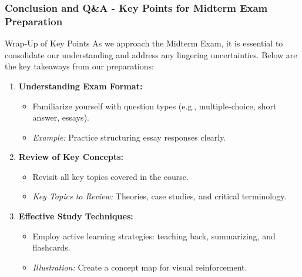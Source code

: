 \documentclass{beamer}
\begin{document}
\begin{frame}[fragile]
    \frametitle{Conclusion and Q\&A - Key Points for Midterm Exam Preparation}
    \begin{block}{Wrap-Up of Key Points}
        As we approach the Midterm Exam, it is essential to consolidate our understanding and address any lingering uncertainties. Below are the key takeaways from our preparations:
    \end{block}
    \begin{enumerate}
        \item \textbf{Understanding Exam Format:}
        \begin{itemize}
            \item Familiarize yourself with question types (e.g., multiple-choice, short answer, essays).
            \item \textit{Example:} Practice structuring essay responses clearly.
        \end{itemize}

        \item \textbf{Review of Key Concepts:}
        \begin{itemize}
            \item Revisit all key topics covered in the course.
            \item \textit{Key Topics to Review:} Theories, case studies, and critical terminology.
        \end{itemize}

        \item \textbf{Effective Study Techniques:}
        \begin{itemize}
            \item Employ active learning strategies: teaching back, summarizing, and flashcards.
            \item \textit{Illustration:} Create a concept map for visual reinforcement.
        \end{itemize}
    \end{enumerate}
\end{frame}
\end{document}
